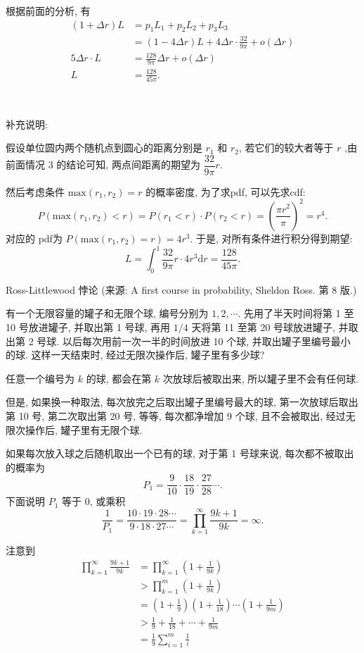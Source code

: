 根据前面的分析, 有 
\begin{align*}
(1+\Delta r)L &= p_1L_1 + p_2L_2 + p_3L_3 \\
&= (1-4\Delta r)L+ 4\Delta r\cdot\frac{32}{9\pi} + o(\Delta r) \\
5\Delta r\cdot L &= \frac{128}{9\pi}\Delta r + o(\Delta r) \\
L &= \frac{128}{45\pi}.
\end{align*}

~

\noindent 补充说明:

假设单位圆内两个随机点到圆心的距离分别是 $r_1$ 和 $r_2$, 若它们的较大者等于 $r$ ,由前面情况 3 的结论可知, 两点间距离的期望为 $\dfrac{32}{9\pi}r$. 

然后考虑条件 $\mathrm{max}(r_1,r_2)=r$ 的概率密度, 为了求pdf, 可以先求cdf: 
\[ P(\mathrm{max}(r_1,r_2) < r) = P(r_1<r)\cdot P(r_2<r) = \left( \frac{\pi r^2}{\pi} \right)^2 = r^4.\]
对应的 pdf为 $P(\mathrm{max}(r_1,r_2) = r) = 4r^3$. 于是, 对所有条件进行积分得到期望:
\[
L = \int_0^1 \frac{32}{9\pi}r\cdot 4r^3 \mathrm{d}r = \frac{128}{45\pi}.
\]

\newpage

\noindent Ross-Littlewood 悖论 (来源: A first course in probability, Sheldon Ross. 第 8 版.)

有一个无限容量的罐子和无限个球, 编号分别为 $ 1, 2, \cdots $. 先用了半天时间将第 1 至 10 号放进罐子, 并取出第 1 号球, 再用 $ 1/4 $ 天将第 11 至第 20 号球放进罐子, 并取出第 2 号球. 以后每次用前一次一半的时间放进 10 个球, 并取出罐子里编号最小的球. 这样一天结束时, 经过无限次操作后, 罐子里有多少球?

任意一个编号为 $ k $ 的球, 都会在第 $ k $ 次放球后被取出来, 所以罐子里不会有任何球.

但是, 如果换一种取法, 每次放完之后取出罐子里编号最大的球, 第一次放球后取出第 10 号, 第二次取出第 20 号, 等等, 每次都净增加 9 个球, 且不会被取出, 经过无限次操作后, 罐子里有无限个球.

如果每次放入球之后随机取出一个已有的球, 对于第 1 号球来说, 每次都不被取出的概率为 
\[ P_1 = \frac{9}{10}\cdot\frac{18}{19}\cdot\frac{27}{28}\cdots .\]
下面说明 $ P_1 $ 等于 0, 或乘积
\[ \frac{1}{P_1} = \frac{10\cdot 19\cdot 28\cdots}{9\cdot 18\cdot 27\cdots} = \prod_{k=1}^\infty{\frac{9k+1}{9k}} =\infty.\]

注意到
\begin{align*}
 \prod_{k=1}^\infty{\frac{9k+1}{9k}} &= \prod_{k=1}^\infty{\left(1+\frac{1}{9k}\right)} \\
	& > \prod_{k=1}^m{\left(1+\frac{1}{9k}\right)} \\
	&= \left(1+\frac{1}{9}\right)\left(1+\frac{1}{18}\right)\cdots\left(1+\frac{1}{9m}\right) \\
	& > \frac{1}{9} + \frac{1}{18} + \cdots + \frac{1}{9m} \\
	& = \frac{1}{9} \sum_{i=1}^m {\frac{1}{i}}
\end{align*}


